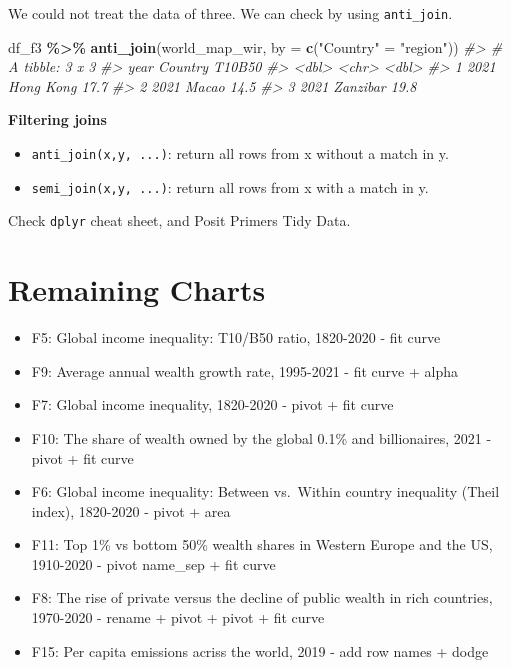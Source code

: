 \documentclass[
  xelatex, ja=standard]{bxjsbook}
\newenvironment{Shaded}{\begin{snugshade}}{\end{snugshade}}
\newcommand{\AttributeTok}[1]{\textcolor[rgb]{0.13,0.29,0.53}{#1}}
\newcommand{\CommentTok}[1]{\textcolor[rgb]{0.56,0.35,0.01}{\textit{#1}}}
\newcommand{\FunctionTok}[1]{\textcolor[rgb]{0.13,0.29,0.53}{\textbf{#1}}}
\newcommand{\NormalTok}[1]{#1}
\newcommand{\OtherTok}[1]{\textcolor[rgb]{0.56,0.35,0.01}{#1}}
\newcommand{\SpecialCharTok}[1]{\textcolor[rgb]{0.81,0.36,0.00}{\textbf{#1}}}
\newcommand{\StringTok}[1]{\textcolor[rgb]{0.31,0.60,0.02}{#1}}
\providecommand{\tightlist}{%
  \setlength{\itemsep}{0pt}\setlength{\parskip}{0pt}}
\theoremstyle{definition}
\theoremstyle{definition}
\theoremstyle{definition}
\theoremstyle{definition}
\theoremstyle{remark}
\begin{document}
We could not treat the data of three. We can check by using \texttt{anti\_join}.

\begin{Shaded}
\begin{Highlighting}[]
\NormalTok{df\_f3 }\SpecialCharTok{\%\textgreater{}\%} \FunctionTok{anti\_join}\NormalTok{(world\_map\_wir, }\AttributeTok{by =} \FunctionTok{c}\NormalTok{(}\StringTok{"Country"} \OtherTok{=} \StringTok{"region"}\NormalTok{))}
\CommentTok{\#\textgreater{} \# A tibble: 3 x 3}
\CommentTok{\#\textgreater{}    year Country   T10B50}
\CommentTok{\#\textgreater{}   \textless{}dbl\textgreater{} \textless{}chr\textgreater{}      \textless{}dbl\textgreater{}}
\CommentTok{\#\textgreater{} 1  2021 Hong Kong   17.7}
\CommentTok{\#\textgreater{} 2  2021 Macao       14.5}
\CommentTok{\#\textgreater{} 3  2021 Zanzibar    19.8}
\end{Highlighting}
\end{Shaded}

\textbf{Filtering joins}

\begin{itemize}
\tightlist
\item
  \texttt{anti\_join(x,y,\ ...)}: return all rows from x without a match in y.
\item
  \texttt{semi\_join(x,y,\ ...)}: return all rows from x with a match in y.
\end{itemize}

Check \texttt{dplyr} cheat sheet, and Posit Primers Tidy Data.

\hypertarget{remaining-charts}{%
\section{Remaining Charts}\label{remaining-charts}}

\begin{itemize}
\item
  F5: Global income inequality: T10/B50 ratio, 1820-2020 - fit curve
\item
  F9: Average annual wealth growth rate, 1995-2021 - fit curve + alpha
\item
  F7: Global income inequality, 1820-2020 - pivot + fit curve
\item
  F10: The share of wealth owned by the global 0.1\% and billionaires, 2021 - pivot + fit curve
\item
  F6: Global income inequality: Between vs.~Within country inequality (Theil index), 1820-2020 - pivot + area
\item
  F11: Top 1\% vs bottom 50\% wealth shares in Western Europe and the US, 1910-2020 - pivot name\_sep + fit curve
\item
  F8: The rise of private versus the decline of public wealth in rich countries, 1970-2020 - rename + pivot + pivot + fit curve
\item
  F15: Per capita emissions acriss the world, 2019 - add row names + dodge
\end{itemize}
\end{document}
